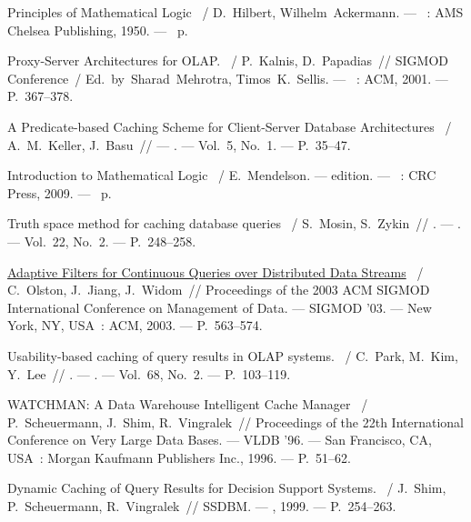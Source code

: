 \documentclass{cmi}
\begin{document}
\begin{biblio}
	 Principles of Mathematical Logic ~/
	D.~Hilbert, Wilhelm~Ackermann. ---
	\newblock [S.\ l.]~: AMS Chelsea Publishing, 1950. ---
	~p.
	
	 Proxy-Server Architectures for OLAP. ~/
	P.~Kalnis, D.~Papadias~// SIGMOD Conference~/ Ed.\ by\
	Sharad~Mehrotra, Timos~K.~Sellis. ---
	\newblock [S.\ l.]~: ACM, 2001. ---
	\newblock P.~367--378.
	
	 A Predicate-based Caching Scheme for Client-Server
	Database Architectures ~/ A.~M.~Keller, J.~Basu~//  ---
	. ---
	\newblock Vol.~5, No.~1. ---
	\newblock P.~35--47.
	
	 Introduction to Mathematical Logic ~/
	E.~Mendelson. ---
	 edition. ---
	\newblock [S.\ l.]~: CRC Press, 2009. ---
	~p.
	
	 Truth space method for caching database queries
	~/ S.~Mosin, S.~Zykin~// . ---
	. ---
	\newblock Vol.~22, No.~2. ---
	\newblock P.~248--258.
	
	\href{http://dx.doi.org/10.1145/872757.872825}{Adaptive Filters for
		Continuous Queries over Distributed Data Streams} ~/ C.~Olston,
	J.~Jiang, J.~Widom~// Proceedings of the 2003 ACM SIGMOD
	International Conference on Management of Data. ---
	\newblock SIGMOD '03. ---
	\newblock New York, NY, USA~: ACM, 2003. ---
	\newblock P.~563--574.
	
	 Usability-based caching of query results in OLAP
	systems. ~/ C.~Park, M.~Kim, Y.~Lee~//
	. ---
	. ---
	\newblock Vol.~68, No.~2. ---
	\newblock P.~103--119.
	
	 WATCHMAN: A Data Warehouse Intelligent Cache
	Manager ~/ P.~Scheuermann, J.~Shim, R.~Vingralek~//
	Proceedings of the 22th International Conference on Very Large Data Bases.
	---
	\newblock VLDB '96. ---
	\newblock San Francisco, CA, USA~: Morgan Kaufmann Publishers Inc., 1996. ---
	\newblock P.~51--62.
	
	 Dynamic Caching of Query Results for Decision Support
	Systems. ~/ J.~Shim, P.~Scheuermann, R.~Vingralek~// SSDBM.
	---
	\newblock [S.\ l.~: s.\ n.], 1999. ---
	\newblock P.~254--263.
\end{biblio}
\end{document}
